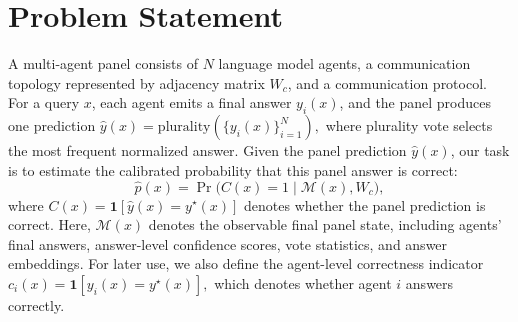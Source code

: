 \section{Problem Statement}
\label{sec:setup}
A multi-agent panel consists of $N$ language model agents, a communication topology represented by adjacency matrix $W_c$, and a communication protocol.
For a query $x$, each agent emits a final answer $y_i(x)$, and the panel produces one prediction
$
\hat{y}(x)=\mathrm{plurality}(\{y_i(x)\}_{i=1}^{N}),
$
where plurality vote selects the most frequent normalized answer.
%
Given the panel prediction $\hat{y}(x)$, our task is to estimate the calibrated probability that this panel answer is correct:
\begin{equation}
\hat{p}(x)
=
\Pr\big(C(x)=1 \mid \mathcal{M}(x), W_c\big),
\end{equation}
where
$
C(x)=\mathbf{1}[\hat{y}(x)=y^\star(x)]
$
denotes whether the panel prediction is correct. 
Here, $\mathcal{M}(x)$ denotes the observable final panel state, including agents' final answers, answer-level confidence scores, vote statistics, and answer embeddings.
For later use, we also define the agent-level correctness indicator
$
c_i(x)=\mathbf{1}[y_i(x)=y^\star(x)],
$
which denotes whether agent $i$ answers correctly.






